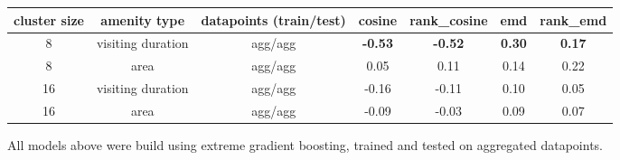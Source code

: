 \documentclass{ws-ijait}
\begin{document}
	\begin{table}[!ht]
		{\begin{tabular}{ | c | c | c | c | c | c | c | }
				\hline
				{cluster size} 	& {amenity type} 	& datapoints (train/test) 	& cosine 	& rank\_cosine & emd & rank\_emd \\ \hline
				8 				& {visiting duration} 		& agg/agg 		& \textbf{-0.53}	& \textbf{-0.52}		&	\textbf{0.30}	&	\textbf{0.17} \\ \hline
				8 				& area 				& agg/agg 		& 0.05	&	0.11	&	0.14	&	0.22 \\ \hline \hline
				16 				& {visiting duration} 		& agg/agg 		& -0.16	&	-0.11	&	0.10	&	0.05 \\ \hline
				16 				& area 				& agg/agg 		& -0.09	&	-0.03	&	0.09	&	0.07 \\ \hline
		\end{tabular}}
		\begin{tabnote}
			All models above were build using extreme gradient boosting, trained and tested on aggregated datapoints.  
		\end{tabnote}
		\label{tab:correlation_amenity_area}
	\end{table}
	
\end{document}
